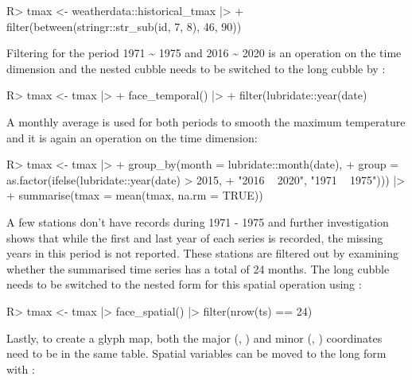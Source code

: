 \documentclass[
]{jss}
\begin{document}
\begin{CodeChunk}
\begin{CodeInput}
R> tmax <- weatherdata::historical_tmax |>
+   filter(between(stringr::str_sub(id, 7, 8), 46, 90))
\end{CodeInput}
\end{CodeChunk}

Filtering for the period 1971 \textasciitilde{} 1975 and 2016 \textasciitilde{} 2020 is an operation on the time dimension and the nested cubble needs to be switched to the long cubble by :

\begin{CodeChunk}
\begin{CodeInput}
R> tmax <- tmax |> 
+   face_temporal() |>
+   filter(lubridate::year(date) %
\end{CodeInput}
\end{CodeChunk}

A monthly average is used for both periods to smooth the maximum temperature and it is again an operation on the time dimension:

\begin{CodeChunk}
\begin{CodeInput}
R> tmax <- tmax |>
+   group_by(month = lubridate::month(date), 
+          group = as.factor(ifelse(lubridate::year(date) > 2015, 
+                                   "2016 ~ 2020", "1971 ~ 1975"))) |>
+   summarise(tmax = mean(tmax, na.rm = TRUE))
\end{CodeInput}
\end{CodeChunk}

A few stations don't have records during 1971 - 1975 and further investigation shows that while the first and last year of each series is recorded, the missing years in this period is not reported. These stations are filtered out by examining whether the summarised time series has a total of 24 months. The long cubble needs to be switched to the nested form for this spatial operation using :

\begin{CodeChunk}
\begin{CodeInput}
R> tmax <- tmax |> face_spatial() |> filter(nrow(ts) == 24) 
\end{CodeInput}
\end{CodeChunk}

Lastly, to create a glyph map, both the major (, ) and minor (, ) coordinates need to be in the same table. Spatial variables can be moved to the long form with :
\end{document}
